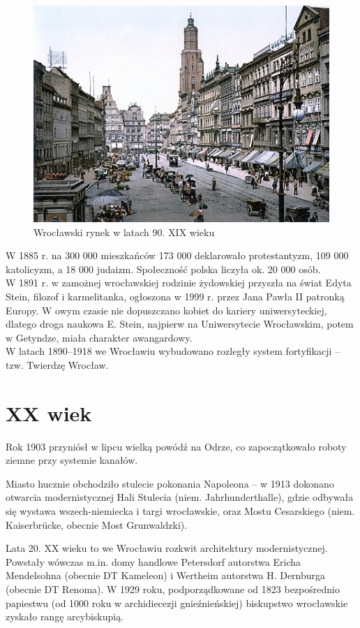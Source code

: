 \documentclass{article}
\begin{document}
\begin{figure}[h!]
\centering
\includegraphics[scale=0.6]{450px-Breslau_Ring_Ostseite_(1890-1900).jpg}
\caption{Wrocławski rynek w latach 90. XIX wieku}
\label{fig:wrorynek}
\end{figure}
W 1885 r. na 300 000 mieszkańców 173 000 deklarowało protestantyzm, 109 000 katolicyzm, a 18 000 judaizm. Społeczność polska liczyła ok. 20 000 osób.
\\
W 1891 r. w zamożnej wrocławskiej rodzinie żydowskiej przyszła na świat Edyta Stein, filozof i karmelitanka, ogłoszona w 1999 r. przez Jana Pawła II patronką Europy. W owym czasie nie dopuszczano kobiet do kariery uniwersyteckiej, dlatego droga naukowa E. Stein, najpierw na Uniwersytecie Wrocławskim, potem w Getyndze, miała charakter awangardowy.
\\
W latach 1890–1918 we Wrocławiu wybudowano rozległy system fortyfikacji – tzw. Twierdzę Wrocław.
\section{XX wiek}
Rok 1903 przyniósł w lipcu wielką powódź na Odrze, co zapoczątkowało roboty ziemne przy systemie kanałów.

Miasto hucznie obchodziło stulecie pokonania Napoleona – w 1913 dokonano otwarcia modernistycznej Hali Stulecia (niem. Jahrhunderthalle), gdzie odbywała się wystawa wszech-niemiecka i targi wrocławskie, oraz Mostu Cesarskiego (niem. Kaiserbrücke, obecnie Most Grunwaldzki).

Lata 20. XX wieku to we Wrocławiu rozkwit architektury modernistycznej. Powstały wówczas m.in. domy handlowe Petersdorf autorstwa Ericha Mendelsohna (obecnie DT Kameleon) i Wertheim autorstwa H. Dernburga (obecnie DT Renoma). W 1929 roku, podporządkowane od 1823 bezpośrednio papiestwu (od 1000 roku w archidiecezji gnieźnieńskiej) biskupstwo wrocławskie zyskało rangę arcybiskupią.
\end{document}
